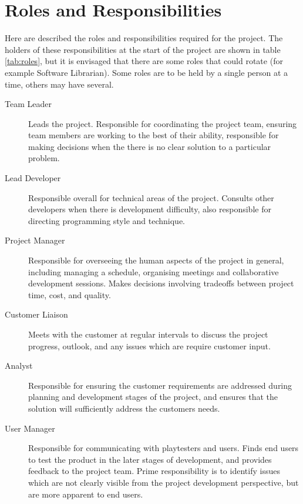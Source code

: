 \section{Roles and Responsibilities}
\label{section:roles}

Here are described the roles and responsibilities required for the project. The holders of these responsibilities at the start of the project are shown in table \ref{tab:roles}, but it is envisaged that there are some roles that could rotate (for example Software Librarian). Some roles are to be held by a single person at a time, others may have several.

\begin{description}
     
    \item[Team Leader] Leads the project. Responsible for coordinating the project team, ensuring team members are working to the best of their ability, responsible for making decisions when the there is no clear solution to a particular problem.
      
    \item[Lead Developer] Responsible overall for technical areas of the project. Consults other developers when there is development difficulty, also responsible for directing programming style and technique.
    
    \item[Project Manager] Responsible for overseeing the human aspects of the project in general, including managing a schedule, organising meetings and collaborative development sessions. Makes decisions involving tradeoffs between project time, cost, and quality. 
     
    \item[Customer Liaison] Meets with the customer at regular intervals to discuss the project progress, outlook, and any issues which are require customer input. 
        
    \item[Analyst] Responsible for ensuring the customer requirements are addressed during planning and development stages of the project, and ensures that the solution will sufficiently address the customers needs.
     
    \item[User Manager] Responsible for communicating with playtesters and users. Finds end users to test the product in the later stages of development, and provides feedback to the project team. Prime responsibility is to identify issues which are not clearly visible from the project development perspective, but are more apparent to end users.
     

\end{description}
